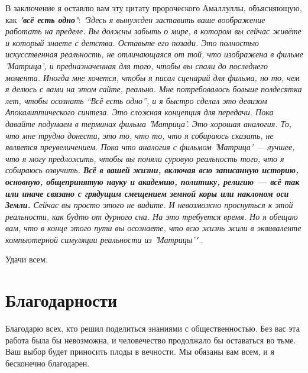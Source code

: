 \documentclass[10pt,twocolumn,letterpaper]{article}
\begin{document}
В заключение я оставлю вам эту цитату пророческого Амаллуллы, объясняющую, как \textit{"\textbf{всё есть одно}"}: \textit{"Здесь я вынужден заставить ваше воображение работать на пределе. Вы должны забыть о мире, в котором вы сейчас живёте и который знаете с детства. Оставьте его позади. Это полностью искусственная реальность, не отличающаяся от той, что изображена в фильме 'Матрица', и предназначенная для того, чтобы вы спали до последнего момента. Иногда мне хочется, чтобы я писал сценарий для фильма, но то, чем я делюсь с вами на этом сайте, реально. Мне потребовалось больше полдесятка лет, чтобы осознать “Всё есть одно”, и я быстро сделал это девизом Апокалиптического синтеза. Это сложная концепция для передачи. Пока давайте подумаем в терминах фильма 'Матрица'. Это хорошая аналогия. То, что мне трудно донести, это то, что то, что я собираюсь сказать, не является преувеличением. Пока что аналогия с фильмом 'Матрица' — лучшее, что я могу предложить, чтобы вы поняли суровую реальность того, что я собираюсь озвучить. \textbf{Всё в вашей жизни, включая всю записанную историю, основную, общепринятую науку и академию, политику, религию — всё так или иначе связано с грядущим смещением земной коры или наклоном оси Земли.} Сейчас вы просто этого не видите. И невозможно проснуться к этой реальности, как будто от дурного сна. На это требуется время. Но я обещаю вам, что в конце этого пути вы осознаете, что всю жизнь жили в эквиваленте компьютерной симуляции реальности из 'Матрицы'"} \cite{33,34}.

Удачи всем.
\section{Благодарности}

Благодарю всех, кто решил поделиться знаниями с общественностью. Без вас эта работа была бы невозможна, и человечество продолжало бы оставаться во тьме. Ваш выбор будет приносить плоды в вечности. Мы обязаны вам всем, и я бесконечно благодарен.

\clearpage
\twocolumn

{\small
\renewcommand{\refname}{Ссылки}


}
\end{document}
